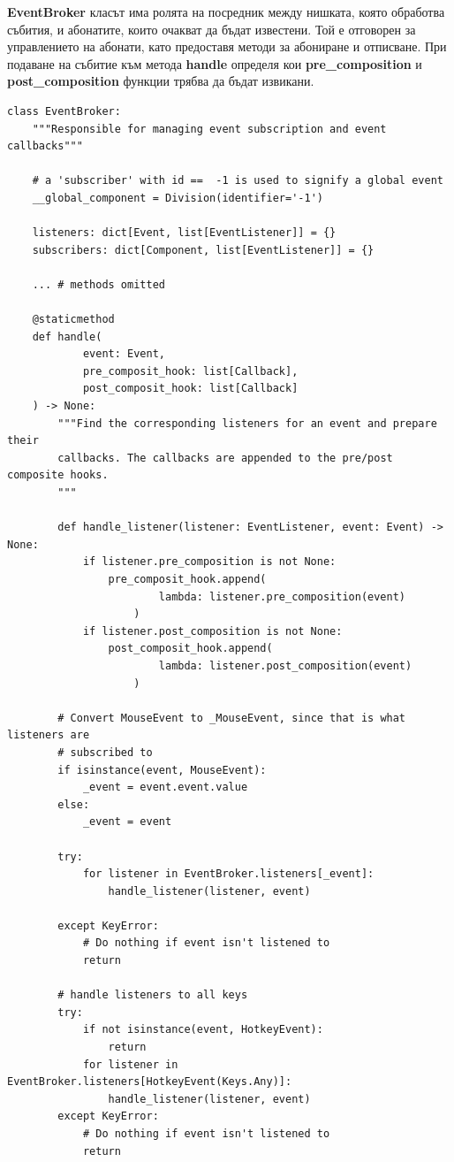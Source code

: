         \textbf{EventBroker} класът има ролята на посредник между нишката, 
        която обработва събития, и абонатите, които очакват да бъдат известени.
        Той е отговорен за управлението на абонати, като предоставя методи за 
        абониране и отписване. При подаване на събитие към метода 
        \textbf{handle} определя кои \textbf{pre\_composition} и 
        \textbf{post\_composition} функции трябва да бъдат извикани.

        \begin{lstlisting}[style=py]
class EventBroker:
    """Responsible for managing event subscription and event callbacks"""

    # a 'subscriber' with id ==  -1 is used to signify a global event
    __global_component = Division(identifier='-1')

    listeners: dict[Event, list[EventListener]] = {}
    subscribers: dict[Component, list[EventListener]] = {}

    ... # methods omitted

    @staticmethod
    def handle(
            event: Event,
            pre_composit_hook: list[Callback],
            post_composit_hook: list[Callback]
    ) -> None:
        """Find the corresponding listeners for an event and prepare their
        callbacks. The callbacks are appended to the pre/post composite hooks.
        """

        def handle_listener(listener: EventListener, event: Event) -> None:
            if listener.pre_composition is not None:
                pre_composit_hook.append(
                        lambda: listener.pre_composition(event)
                    )
            if listener.post_composition is not None:
                post_composit_hook.append(
                        lambda: listener.post_composition(event)
                    )

        # Convert MouseEvent to _MouseEvent, since that is what listeners are
        # subscribed to
        if isinstance(event, MouseEvent):
            _event = event.event.value
        else:
            _event = event

        try:
            for listener in EventBroker.listeners[_event]:
                handle_listener(listener, event)

        except KeyError:
            # Do nothing if event isn't listened to
            return

        # handle listeners to all keys
        try:
            if not isinstance(event, HotkeyEvent):
                return
            for listener in EventBroker.listeners[HotkeyEvent(Keys.Any)]:
                handle_listener(listener, event)
        except KeyError:
            # Do nothing if event isn't listened to
            return
        \end{lstlisting}

